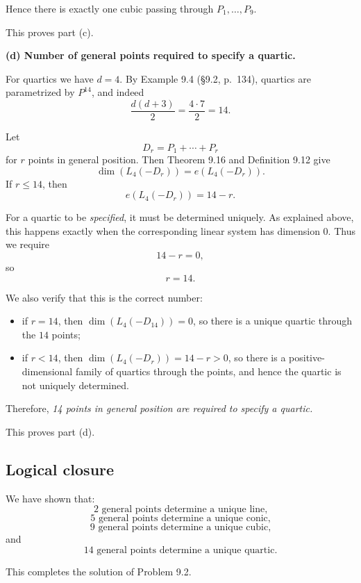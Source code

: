 \documentclass[a4paper,12pt,openany]{article}
\theoremstyle{plain}
\theoremstyle{definition}
\theoremstyle{remark}
\begin{document}
Hence there is exactly one cubic passing through
$P_1,\dots,P_9$.

This proves part \textup{(c)}.

\medskip

\noindent\textbf{(d) Number of general points required to specify a quartic.}

For quartics we have $d=4$. By Example 9.4 (\S9.2, p.~134), quartics are
parametrized by $P^{14}$, and indeed
\[
\frac{d(d+3)}{2}=\frac{4\cdot 7}{2}=14.
\]

Let
\[
D_r=P_1+\cdots+P_r
\]
for $r$ points in general position. Then Theorem 9.16 and Definition 9.12
give
\[
\dim(L_4(-D_r))=e(L_4(-D_r)).
\]
If $r\le 14$, then
\[
e(L_4(-D_r))=14-r.
\]

For a quartic to be \emph{specified}, it must be determined uniquely.
As explained above, this happens exactly when the corresponding linear
system has dimension $0$. Thus we require
\[
14-r=0,
\]
so
\[
r=14.
\]

We also verify that this is the correct number:

\begin{itemize}
    \item if $r=14$, then $\dim(L_4(-D_{14}))=0$, so there is a unique
    quartic through the $14$ points;

    \item if $r<14$, then $\dim(L_4(-D_r))=14-r>0$, so there is a
    positive-dimensional family of quartics through the points, and hence
    the quartic is not uniquely determined.
\end{itemize}

Therefore, \emph{14 points in general position are required to specify a
quartic.}

This proves part \textup{(d)}.

\subsection*{Logical closure}

We have shown that:
\[
2 \text{ general points determine a unique line,}
\]
\[
5 \text{ general points determine a unique conic,}
\]
\[
9 \text{ general points determine a unique cubic,}
\]
and
\[
14 \text{ general points determine a unique quartic.}
\]

This completes the solution of Problem 9.2.
\end{document}
